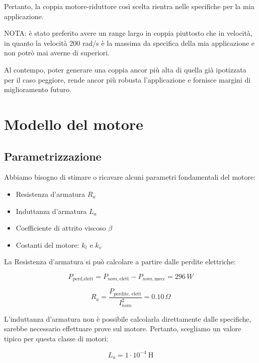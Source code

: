 \documentclass[a4paper,12pt]{article}
\begin{document}
Pertanto, la coppia motore-riduttore così scelta rientra nelle specifiche per la mia applicazione.

\vspace{0.5cm}

NOTA: è stato preferito avere un range largo in coppia piuttosto che in velocità, in quanto la velocità 200 rad/s è la massima da specifica della mia applicazione e non potrò mai averne di superiori.

Al contempo, poter generare una coppia ancor più alta di quella già ipotizzata per il caso peggiore, rende ancor più robusta l'applicazione e fornisce margini di miglioramento futuro.

\newpage



\section{Modello del motore}

\subsection{Parametrizzazione}

Abbiamo bisogno di stimare o ricavare alcuni parametri fondamentali del motore:

\begin{itemize}
    \item Resistenza d'armatura \( R_a \)
    \item Induttanza d'armatura \( L_a \)
    \item Coefficiente di attrito viscoso \( \beta \)
    \item Costanti del motore: \( k_t \) e \( k_v \)
\end{itemize}

\vspace{0.5cm}
La Resistenza d'armatura si può calcolare a partire dalle perdite elettriche:

\[
    P_{\text{perd,elett}} = P_{nom, \text{elett}} - P_{nom, \text{mecc}} = 296\,W
\]

\[
    R_a = \frac{P_{\text{perdite, elett}}}{I_{nom}^2}=0.10\,\Omega
\]
\vspace{0.5cm}

L'induttanza d'armatura non è possibile calcolarla direttamente dalle specifiche, sarebbe necessario effettuare prove sul motore. Pertanto, scegliamo un valore tipico per questa classe di motori:

\[
    L_a = 1 \cdot 10^{-4} \ \text{H}
\]
\end{document}
